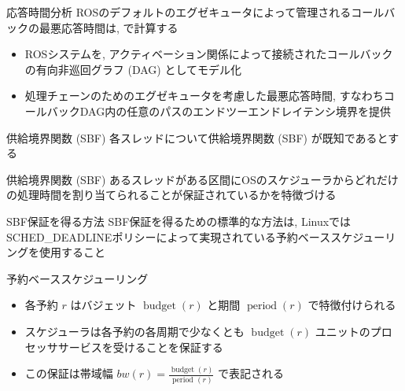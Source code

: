 \begin{frame}{応答時間分析}
    ROSのデフォルトのエグゼキュータによって管理されるコールバックの最悪応答時間は, で計算する
    \begin{block}{}
        \begin{itemize}
            \item ROSシステムを, アクティベーション関係によって接続されたコールバックの有向非巡回グラフ (DAG) としてモデル化
            \item 処理チェーンのためのエグゼキュータを考慮した最悪応答時間, すなわちコールバックDAG内の任意のパスのエンドツーエンドレイテンシ境界を提供
        \end{itemize}
    \end{block}
\end{frame}

\begin{frame}{供給境界関数 (SBF)}
    各スレッドについて供給境界関数 (SBF) が既知であるとする
    \begin{block}{供給境界関数 (SBF)}
        あるスレッドがある区間にOSのスケジューラからどれだけの処理時間を割り当てられることが保証されているかを特徴づける
    \end{block}
\end{frame}

\begin{frame}{SBF保証を得る方法}
    SBF保証を得るための標準的な方法は, LinuxではSCHED\_DEADLINEポリシーによって実現されている予約ベーススケジューリングを使用すること
    \begin{block}{予約ベーススケジューリング}
        \setlength{\linewidth}{0.98\columnwidth}
        \begin{itemize}
            \item 各予約 $r$ はバジェット $\operatorname{budget}(r)$ と期間 $\operatorname{period}(r)$ で特徴付けられる
            \item スケジューラは各予約の各周期で少なくとも $\operatorname{budget}(r)$ ユニットのプロセッササービスを受けることを保証する
            \item この保証は帯域幅 $b w(r)=\frac{\operatorname{budget}(r)}{\text { period }(r)}$ で表記される
        \end{itemize}
    \end{block}
\end{frame}

